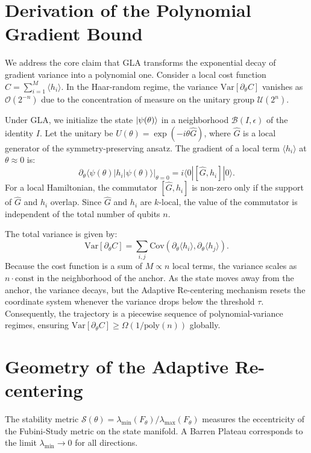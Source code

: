 \documentclass[aps,prx,reprint,superscriptaddress,amsmath,amssymb]{revtex4-2}
\newcommand{\Var}{\mathrm{Var}}
\newcommand{\poly}{\mathrm{poly}}
\begin{document}
\appendix

\section{Derivation of the Polynomial Gradient Bound} \label{app:gradient_proof}
We address the core claim that GLA transforms the exponential decay of gradient variance into a polynomial one. Consider a local cost function $C = \sum_{i=1}^M \langle h_i \rangle$. In the Haar-random regime, the variance $\Var[\partial_\theta C]$ vanishes as $\mathcal{O}(2^{-n})$ due to the concentration of measure on the unitary group $\mathcal{U}(2^n)$.

Under GLA, we initialize the state $\ket{\psi(\theta)}$ in a neighborhood $\mathcal{B}(I, \epsilon)$ of the identity $I$. Let the unitary be $U(\theta) = \exp(-i \theta \hat{G})$, where $\hat{G}$ is a local generator of the symmetry-preserving ansatz. The gradient of a local term $\langle h_i \rangle$ at $\theta \approx 0$ is:
\begin{equation}
\partial_\theta \langle \psi(\theta) | h_i | \psi(\theta) \rangle \Big|_{\theta=0} = i \langle 0 | [\hat{G}, h_i] | 0 \rangle.
\end{equation}
For a local Hamiltonian, the commutator $[\hat{G}, h_i]$ is non-zero only if the support of $\hat{G}$ and $h_i$ overlap. Since $\hat{G}$ and $h_i$ are $k$-local, the value of the commutator is independent of the total number of qubits $n$.

The total variance is given by:
\begin{equation}
\Var[\partial_\theta C] = \sum_{i,j} \text{Cov}(\partial_\theta \langle h_i \rangle, \partial_\theta \langle h_j \rangle).
\end{equation}
Because the cost function is a sum of $M \propto n$ local terms, the variance scales as $n \cdot \text{const}$ in the neighborhood of the anchor. As the state moves away from the anchor, the variance decays, but the Adaptive Re-centering mechanism resets the coordinate system whenever the variance drops below the threshold $\tau$. Consequently, the trajectory is a piecewise sequence of polynomial-variance regimes, ensuring $\Var[\partial_\theta C] \ge \Omega(1/\poly(n))$ globally.

\section{Geometry of the Adaptive Re-centering} \label{app:qfim_geometry}
The stability metric $\mathcal{S}(\theta) = \lambda_{\min}(F_\theta)/\lambda_{\max}(F_\theta)$ measures the eccentricity of the Fubini-Study metric on the state manifold. A Barren Plateau corresponds to the limit $\lambda_{\min} \to 0$ for all directions.
\end{document}
